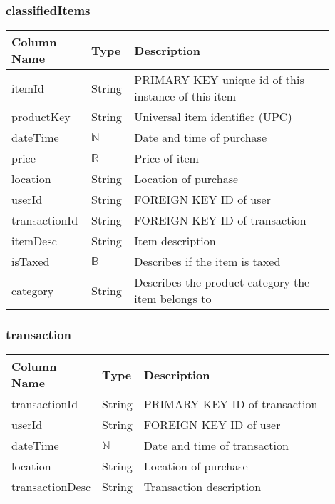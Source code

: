 \documentclass[12pt, titlepage]{article}
\begin{document}
\subsubsection{classifiedItems}
\begin{table}[H]
  \begin{tabular}{|p{0.2\linewidth}|p{0.1\linewidth}|p{0.6\linewidth}|}
    \hline
    \textbf{Column Name} & \textbf{Type} & \textbf{Description} \\
    \hline
    itemId & String & PRIMARY KEY unique id of this instance of this item \\
    \hline
    productKey & String & Universal item identifier (UPC) \\
    \hline
    dateTime & $\mathbb{N}$ & Date and time of purchase \\
    \hline
    price & $\mathbb{R}$ & Price of item \\
    \hline
    location & String & Location of purchase \\
    \hline
    userId & String & FOREIGN KEY ID of user\\
    \hline
    transactionId & String &  FOREIGN KEY ID of transaction\\
    \hline
    itemDesc & String & Item description\\
    \hline
    isTaxed & $\mathbb{B}$ & Describes if the item is taxed\\
    \hline
    category & String & Describes the product category the item belongs to\\
    \hline
  \end{tabular}
\end{table}

\subsubsection{transaction}
\begin{table}[H]
  \begin{tabular}{|p{0.2\linewidth}|p{0.1\linewidth}|p{0.6\linewidth}|}
    \hline
    \textbf{Column Name} & \textbf{Type} & \textbf{Description} \\
    \hline
    transactionId & String & PRIMARY KEY ID of transaction\\
    \hline
    userId & String & FOREIGN KEY ID of user\\
    \hline
    dateTime & $\mathbb{N}$ & Date and time of transaction \\
    \hline
    location & String & Location of purchase \\
    \hline
    transactionDesc & String & Transaction description\\
    \hline
  \end{tabular}
\end{table}
\end{document}
